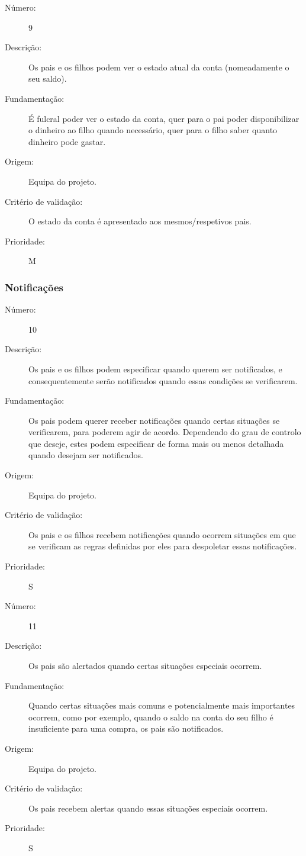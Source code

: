 \documentclass{article}
\begin{document}
            \begin{description}
        \item[Número:]9
        \item[Descrição:]Os pais e os filhos podem ver o estado atual da conta (nomeadamente o seu saldo).
        \item[Fundamentação:]É fulcral poder ver o estado da conta, quer para o pai poder disponibilizar o dinheiro ao filho quando necessário, quer para o filho saber quanto dinheiro pode gastar.
        \item[Origem:]Equipa do projeto.
        \item[Critério de validação:]O estado da conta é apresentado aos mesmos/respetivos pais.
        \item[Prioridade:]M
      \end{description}

    \subsubsection{Notificações}  

            \begin{description}
        \item[Número:]10
        \item[Descrição:]Os pais e os filhos podem especificar quando querem ser notificados, e consequentemente serão notificados quando essas condições se verificarem.
        \item[Fundamentação:]Os pais podem querer receber notificações quando certas situações se verificarem, para poderem agir de acordo. Dependendo do grau de controlo que deseje, estes podem especificar de forma mais ou menos detalhada quando desejam ser notificados.
        \item[Origem:]Equipa do projeto.
        \item[Critério de validação:]Os pais e os filhos recebem notificações quando ocorrem situações em que se verificam as regras definidas por eles para despoletar essas notificações.
        \item[Prioridade:]S
      \end{description}
\vspace{0.5cm}
     \begin{description}
        \item[Número:]11
        \item[Descrição:]Os pais são alertados quando certas situações especiais ocorrem.
        \item[Fundamentação:]Quando certas situações mais comuns e potencialmente mais importantes ocorrem, como por exemplo, quando o saldo na conta do seu filho é insuficiente para uma compra, os pais são notificados.
        \item[Origem:]Equipa do projeto.
        \item[Critério de validação:]Os pais recebem alertas quando essas situações especiais ocorrem.
        \item[Prioridade:]S
      \end{description}
\end{document}
